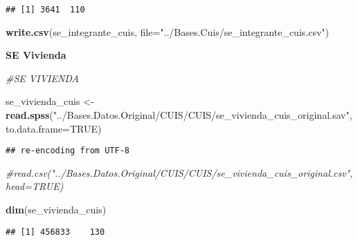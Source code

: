 \documentclass[11pt,]{article}
\newenvironment{Shaded}{\begin{snugshade}}{\end{snugshade}}
\newcommand{\KeywordTok}[1]{\textcolor[rgb]{0.13,0.29,0.53}{\textbf{#1}}}
\newcommand{\DataTypeTok}[1]{\textcolor[rgb]{0.13,0.29,0.53}{#1}}
\newcommand{\DecValTok}[1]{\textcolor[rgb]{0.00,0.00,0.81}{#1}}
\newcommand{\StringTok}[1]{\textcolor[rgb]{0.31,0.60,0.02}{#1}}
\newcommand{\CommentTok}[1]{\textcolor[rgb]{0.56,0.35,0.01}{\textit{#1}}}
\newcommand{\OtherTok}[1]{\textcolor[rgb]{0.56,0.35,0.01}{#1}}
\newcommand{\OperatorTok}[1]{\textcolor[rgb]{0.81,0.36,0.00}{\textbf{#1}}}
\newcommand{\NormalTok}[1]{#1}
\begin{document}
\begin{verbatim}
## [1] 3641  110
\end{verbatim}

\begin{Shaded}
\begin{Highlighting}[]
\KeywordTok{write.csv}\NormalTok{(se_integrante_cuis, }\DataTypeTok{file=}\StringTok{"../Bases.Cuis/se_integrante_cuis.csv"}\NormalTok{)}
\end{Highlighting}
\end{Shaded}

\textbf{SE Vivienda}

\begin{Shaded}
\begin{Highlighting}[]
\CommentTok{#SE VIVIENDA}

\NormalTok{se_vivienda_cuis <-}\StringTok{ }\KeywordTok{read.spss}\NormalTok{(}\StringTok{"../Bases.Datos.Original/CUIS/CUIS/se_vivienda_cuis_original.sav"}\NormalTok{, }\DataTypeTok{to.data.frame=}\OtherTok{TRUE}\NormalTok{)}
\end{Highlighting}
\end{Shaded}

\begin{verbatim}
## re-encoding from UTF-8
\end{verbatim}

\begin{Shaded}
\begin{Highlighting}[]
                   \CommentTok{#read.csv("../Bases.Datos.Original/CUIS/CUIS/se_vivienda_cuis_original.csv", head=TRUE)}

\KeywordTok{dim}\NormalTok{(se_vivienda_cuis)}
\end{Highlighting}
\end{Shaded}

\begin{verbatim}
## [1] 456833    130
\end{verbatim}

\begin{Shaded}
\end{Shaded}
\end{document}
